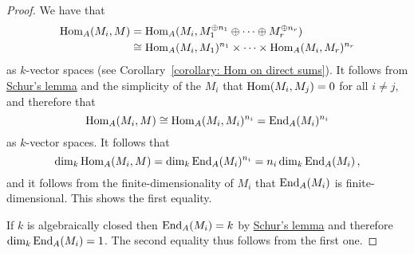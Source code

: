 \begin{proof}
  We have that
  \begin{align*}
            \operatorname{Hom}_A(M_i, M)
    &=      \operatorname{Hom}_A(M_i, M_1^{\oplus n_1} \oplus \dotsb \oplus M_r^{\oplus n_r}) \\
    &\cong  \operatorname{Hom}_A(M_i, M_1)^{n_1} \times \dotsb \times \operatorname{Hom}_A(M_i, M_r)^{n_r}
  \end{align*}
  as $k$-vector spaces (see Corollary~\ref{corollary: Hom on direct sums}).
  It follows from \hyperref[proposition: schurs lemma for modules]{Schur’s lemma} and the simplicity of the $M_i$ that $\operatorname{Hom}(M_i, M_j) = 0$ for all $i \neq j$, and therefore that
  \[
          \operatorname{Hom}_A(M_i, M)
    \cong \operatorname{Hom}_A(M_i, M_i)^{n_i}
    =     \operatorname{End}_A(M_i)^{n_i}
  \]
  as $k$-vector spaces.
  It follows that
  \[
      \dim_k \operatorname{Hom}_A(M_i, M)
    = \dim_k \operatorname{End}_A(M_i)^{n_i}
    = n_i \dim_k \operatorname{End}_A(M_i) \,,
  \]
  and it follows from the finite-dimensionality of $M_i$ that $\operatorname{End}_A(M_i)$ is finite-dimensional.
  This shows the first equality.
  
  If $k$ is algebraically closed then $\operatorname{End}_A(M_i) = k$ by \hyperref[proposition: schurs lemma for modules]{Schur’s lemma} and therefore $\dim_k \operatorname{End}_A(M_i) = 1$.
  The second equality thus follows from the first one.
\end{proof}
